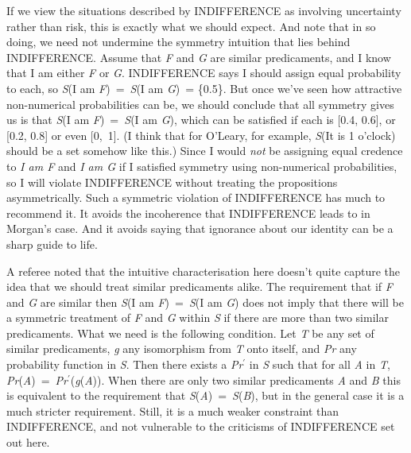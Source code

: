 \documentclass[
  11pt,
  letterpaper,
  DIV=11,
  numbers=noendperiod,
  oneside]{scrartcl}
\begin{document}
If we view the situations described by INDIFFERENCE as involving
uncertainty rather than risk, this is exactly what we should expect. And
note that in so doing, we need not undermine the symmetry intuition that
lies behind INDIFFERENCE. Assume that \emph{F} and \emph{G} are similar
predicaments, and I know that I am either \emph{F} or \emph{G}.
INDIFFERENCE says I should assign equal probability to each, so
\emph{S}(I am \emph{F})~=~\emph{S}(I am \emph{G})~= \{0.5\}. But once
we've seen how attractive non-numerical probabilities can be, we should
conclude that all symmetry gives us is that \emph{S}(I am
\emph{F})~=~\emph{S}(I am \emph{G}), which can be satisfied if each is
{[}0.4, 0.6{]}, or {[}0.2, 0.8{]} or even {[}0,~1{]}. (I think that for
O'Leary, for example, \emph{S}(It is 1 o'clock) should be a set somehow
like this.) Since I would \emph{not} be assigning equal credence to
\emph{I am F} and \emph{I am G} if I satisfied symmetry using
non-numerical probabilities, so I will violate INDIFFERENCE without
treating the propositions asymmetrically. Such a symmetric violation of
INDIFFERENCE has much to recommend it. It avoids the incoherence that
INDIFFERENCE leads to in Morgan's case. And it avoids saying that
ignorance about our identity can be a sharp guide to life.

A referee noted that the intuitive characterisation here doesn't quite
capture the idea that we should treat similar predicaments alike. The
requirement that if \emph{F} and \emph{G} are similar then \emph{S}(I am
\emph{F})~=~\emph{S}(I am \emph{G}) does not imply that there will be a
symmetric treatment of \emph{F} and \emph{G} within \emph{S} if there
are more than two similar predicaments. What we need is the following
condition. Let \emph{T} be any set of similar predicaments, \emph{g} any
isomorphism from \emph{T} onto itself, and \emph{Pr} any probability
function in \emph{S}. Then there exists a \emph{Pr}\(^\prime\) in
\emph{S} such that for all \emph{A} in \emph{T},
\emph{Pr}(\emph{A})~=~\emph{Pr}\(^\prime\)(\emph{g}(\emph{A})). When
there are only two similar predicaments \emph{A} and \emph{B} this is
equivalent to the requirement that
\emph{S}(\emph{A})~=~\emph{S}(\emph{B}), but in the general case it is a
much stricter requirement. Still, it is a much weaker constraint than
INDIFFERENCE, and not vulnerable to the criticisms of INDIFFERENCE set
out here.
\end{document}
